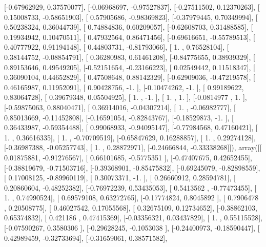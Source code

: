 \documentclass{article}
\begin{document}
       [-0.67962929,  0.37570077],
       [-0.06968697, -0.97527837],
       [-0.27511502,  0.12370263],
       [ 0.15008733, -0.58651903],
       [ 0.57905686, -0.98369823],
       [-0.37979445,  0.70349994],
       [ 0.50238324,  0.36044739],
       [ 0.74884836,  0.60209057],
       [-0.62608703,  0.31488585],
       [ 0.19934942,  0.10470511],
       [ 0.47932564,  0.86471456],
       [-0.69616651, -0.55789513],
       [ 0.40777922,  0.91194148],
       [ 0.44803731, -0.81793066],
       [ 1.        ,  0.76528104],
       [ 0.38144752, -0.08854791],
       [ 0.36280983,  0.61461208],
       [-0.84775655,  0.38939329],
       [ 0.89153646,  0.49549205],
       [-0.52151654, -0.23166223],
       [ 0.02549442,  0.11518347],
       [ 0.36090104,  0.44652829],
       [ 0.47508648,  0.88142329],
       [-0.62909036, -0.47219578],
       [ 0.46165987,  0.11952091],
       [ 0.90428756, -1.        ],
       [-0.10474262, -1.        ],
       [ 0.99189622,  0.83064728],
       [ 0.39679348,  0.05504925],
       [ 1.        , -1.        ],
       [ 1.        ,  1.        ],
       [-0.0814977 ,  1.        ],
       [-0.59875063,  0.88040471],
       [ 0.36914016, -0.04307214],
       [ 1.        , -0.06982777],
       [ 0.85013669, -0.11452808],
       [-0.16591054, -0.82843767],
       [-0.18529873, -1.        ],
       [ 0.36433987, -0.59354488],
       [ 0.99068933, -0.94095147],
       [-0.77984568,  0.47160421],
       [ 1.        ,  0.36616335],
       [ 1.        , -0.70709519],
       [-0.65847629,  0.16288857],
       [ 1.        ,  0.29274128],
       [-0.36987388, -0.05257743],
       [ 1.        ,  0.28872971],
       [-0.24666844, -0.33338268]]), array([[ 0.01875881, -0.91276567],
       [ 0.66101685, -0.5775351 ],
       [-0.47407675,  0.42652455],
       [-0.38819679, -0.71503716],
       [-0.39368901, -0.85475832],
       [-0.69245079, -0.82898559],
       [ 0.17008125, -0.89960119],
       [ 0.30073371, -1.        ],
       [ 0.26660912,  0.28594781],
       [ 0.20860604, -0.48252382],
       [-0.76972239,  0.53435053],
       [ 0.5413562 , -0.77473455],
       [ 1.        ,  0.74990524],
       [ 0.69579108,  0.63272765],
       [-0.17774824,  0.8045892 ],
       [ 0.7906478 ,  0.20508775],
       [ 0.46027542,  0.17055568],
       [ 0.32675109,  0.12734652],
       [-0.38862103,  0.65374832],
       [ 0.421186  ,  0.47415369],
       [-0.03356321,  0.03437829],
       [ 1.        ,  0.55115528],
       [-0.07590267,  0.3580306 ],
       [-0.29628245, -0.1053038 ],
       [-0.24400973, -0.18590447],
       [ 0.42989459, -0.32733694],
       [-0.31659061,  0.38571582],
\end{document}
